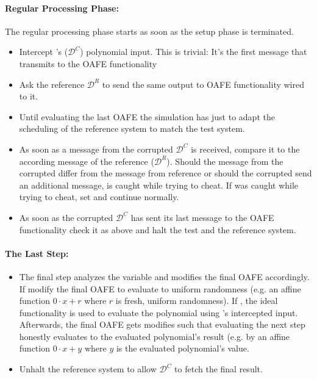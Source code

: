 \paragraph{Regular Processing Phase:}

The regular processing phase starts as soon as the setup phase is terminated.

\begin{itemize}

  \item Intercept \JWpTwo{}'s ($\mathcal{D}^C$) polynomial input. This is
    trivial: It's the first message that \JWpTwo{} transmits to the OAFE
    functionality

  \item Ask the reference \JWpTwo{} $\mathcal{D}^R$ to send the same output to
    OAFE functionality wired to it.

  \item Until evaluating the last OAFE the simulation has just to adapt the
    scheduling of the reference system to match the test system.

  \item As soon as a message from the corrupted \JWpTwo{} $\mathcal{D}^C$ is
    received, compare it to the according message of the reference \JWpTwo{}
    ($\mathcal{D}^R$). Should the message from the corrupted \JWpTwo{} differ
    from the message from reference \JWpTwo{} or should the corrupted \JWpTwo{}
    send an additional message, \JWpTwo{} is caught while trying to cheat. If
    \JWpTwo{} was caught while trying to cheat, set  and continue normally.

  \item As soon as the corrupted $\mathcal{D}^C$ has sent its last message to
    the OAFE functionality check it as above and halt the test and the reference
    system.

\end{itemize}

\paragraph{The Last Step:}

\begin{itemize}

  \item The final step analyzes the variable  and modifies the
    final OAFE accordingly. If  modify the final OAFE
    to evaluate to uniform randomness (e.g. an affine function $0 \cdot x + r$
    where $r$ is fresh, uniform randomness).  If ,
    the ideal functionality is used to evaluate the polynomial using \JWpTwo{}'s
    intercepted input. Afterwards, the final OAFE gets modifies such
    that evaluating the next step honestly evaluates to the evaluated
    polynomial's result (e.g. by an affine function $0 \cdot x + y$ where $y$ is
    the evaluated polynomial's value.

  \item Unhalt the reference system to allow $\mathcal{D}^C$ to fetch the final
    result.

\end{itemize}


